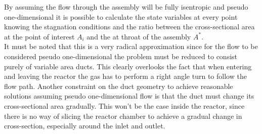 	By assuming the flow through the assembly will be fully isentropic and pseudo one-dimensional it is possible to calculate the state variables at every point knowing the stagnation conditions and the ratio between the cross-sectional area at the point of interest $A_i$ and the at throat of the assembly $A^*$.\\
	It must be noted that this is a very radical approximation since for the flow to be  considered pseudo one-dimensional the problem must be reduced to consist purely of variable area ducts.
	This clearly overlooks the fact that when entering and leaving the reactor the gas has to perform a right angle turn to follow the flow path.
	Another constraint on the duct geometry to achieve reasonable solutions assuming pseudo one-dimensional flow is that the duct must change its cross-sectional area gradually.
	\cite{anderson2021modern}
	This won't be the case inside the reactor, since there is no way of slicing the reactor chamber to achieve a gradual change in cross-section, especially around the inlet and outlet.
